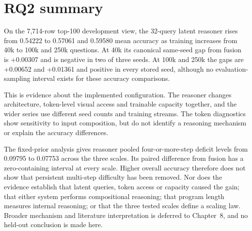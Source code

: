 \begin{table}[p]
\centering
\caption[Pooled four-or-more-step deficits.]{Development-set pooled $\geq$4-step deficit levels and separate paired reasoner-minus-fusion deficit differences. Forty-k level intervals are image-clustered; 100k/250k levels have no interval. Displayed 40k fusion uses five seeds, whereas paired contrasts use seeds 0/1/2, so level cells must not be subtracted. Positive contrast means a larger reasoner deficit. A lower deficit is not a ranking of overall accuracy or reasoning ability; it describes the relative fixed-prior step-depth profile.}
\label{tab:ch5-deficits}
\begingroup\scriptsize\setlength{\tabcolsep}{1pt}
\renewenvironment{longtable}[1]{\begin{tabular}{|p{0.10\textwidth}|p{0.18\textwidth}|p{0.06\textwidth}|p{0.13\textwidth}|p{0.18\textwidth}|p{0.20\textwidth}|}}{\end{tabular}}
\let\endhead\relax\renewcommand{\_}{\textunderscore\allowbreak}

\endgroup
\end{table}

\clearpage
\section{RQ2 summary}
\label{sec:ch5-summary}
On the 7,714-row top-100 development view, the 32-query latent reasoner rises
from 0.54222 to 0.57061 and 0.59580 mean accuracy as training increases from
40k to 100k and 250k questions. At 40k its canonical same-seed gap from fusion
is +0.00307 and is negative in two of three seeds. At 100k and 250k the gaps
are +0.00652 and +0.01361 and positive in every stored seed, although no
evaluation-sampling interval exists for these accuracy comparisons.

This is evidence about the implemented configuration. The reasoner changes
architecture, token-level visual access and trainable capacity together, and
the wider series use different seed counts and training streams. The token
diagnostics show sensitivity to input composition, but do not identify a
reasoning mechanism or explain the accuracy differences.

The fixed-prior analysis gives reasoner pooled four-or-more-step deficit levels
from 0.09795 to 0.07753 across the three scales. Its paired difference from
fusion has a zero-containing interval at every scale. Higher overall accuracy
therefore does not show that persistent multi-step difficulty has been removed.
Nor does the evidence establish that latent queries, token access or capacity
caused the gain; that either system performs compositional reasoning; that
program length measures internal reasoning; or that the three tested scales
define a scaling law. Broader mechanism and literature interpretation is
deferred to Chapter~8, and no held-out conclusion is made here.
